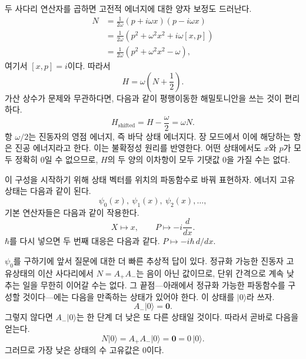 두 사다리 연산자를 곱하면 고전적 에너지에 대한 양자 보정도 드러난다.
\begin{align}
N
&=\frac{1}{2\omega}(p+i\omega x)(p-i\omega x)\\
&=\frac{1}{2\omega}\left(p^{2}+\omega^{2}x^{2}
 +i\omega[x,p]\right)\\
&=\frac{1}{2\omega}\left(p^{2}+\omega^{2}x^{2}-\omega\right),
\end{align}
여기서 \([x,p]=i\)이다. 따라서
\begin{equation}
H=\omega\left(N+\frac12\right).
\end{equation}
가산 상수가 문제와 무관하다면, 다음과 같이 평행이동한 해밀토니안을 쓰는 것이 편리하다.
\begin{equation}
H_{\mathrm{shifted}}=H-\frac{\omega}{2}=\omega N.
\end{equation}
항 \(\omega/2\)는 진동자의 영점 에너지, 즉 바닥 상태 에너지다. 장 모드에서 이에 해당하는 항은 진공 에너지라고 한다. 이는 불확정성 원리를 반영한다. 어떤 상태에서도 \(x\)와 \(p\)가 모두 정확히 0일 수 없으므로, \(H\)의 두 양의 이차항이 모두 기댓값 0을 가질 수는 없다.

\begin{classroomqa}
\end{classroomqa}

이 구성을 시작하기 위해 상태 벡터를 위치의 파동함수로 바꿔 표현하자. 에너지 고유상태는 다음과 같이 된다.
\[
\psi_{0}(x),\ \psi_{1}(x),\ \psi_{2}(x),\ldots,
\]
기본 연산자들은 다음과 같이 작용한다.
\begin{equation}
X\longmapsto x,\qquad
P\longmapsto -i\frac{d}{dx}.
\end{equation}
\(\hbar\)를 다시 넣으면 두 번째 대응은 다음과 같다.
\(P\mapsto-i\hbar\,d/dx\).

\(\psi_{0}\)를 구하기에 앞서 질문에 대한 더 빠른 추상적 답이 있다. 정규화 가능한 진동자 고유상태의 이산 사다리에서 \(N=A_{+}A_{-}\)는 음이 아닌 값이므로, 단위 간격으로 계속 낮추는 일을 무한히 이어갈 수는 없다. 그 끝점---아래에서 정규화 가능한 파동함수를 구성할 것이다---에는 다음을 만족하는 상태가 있어야 한다. 이 상태를 \(\lvert0\rangle\)라 쓰자.
\begin{equation}
A_{-}\lvert0\rangle=\mathbf 0.
\end{equation}
그렇지 않다면 \(A_{-}\lvert0\rangle\)는 한 단계 더 낮은 또 다른 상태일 것이다. 따라서 곧바로 다음을 얻는다.
\begin{equation}
N\lvert0\rangle
=A_{+}A_{-}\lvert0\rangle
=\mathbf 0
=0\,\lvert0\rangle.
\end{equation}
그러므로 가장 낮은 상태의 수 고유값은 0이다.

